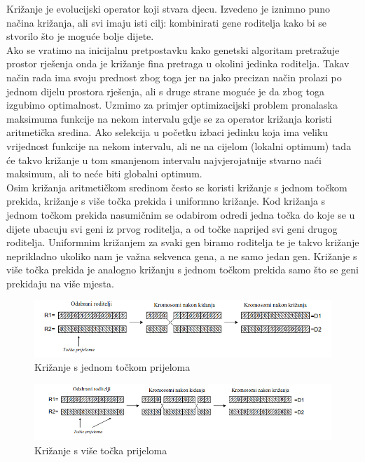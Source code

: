 \documentclass[times, utf8, zavrsni]{fer}
\begin{document}
	Križanje je evolucijski operator koji stvara djecu. Izvedeno je iznimno puno načina križanja, ali svi imaju isti cilj: kombinirati gene roditelja kako bi se stvorilo što je moguće bolje dijete. \\Ako se vratimo na inicijalnu pretpostavku kako genetski algoritam pretražuje prostor rješenja onda je križanje fina pretraga u okolini jedinka roditelja. Takav način rada ima svoju prednost zbog toga jer na jako precizan način prolazi po jednom dijelu prostora rješenja, ali s druge strane moguće je da zbog toga izgubimo optimalnost. Uzmimo za primjer optimizacijski problem pronalaska maksimuma funkcije na nekom intervalu gdje se za operator križanja koristi aritmetička sredina. Ako selekcija u početku izbaci jedinku koja ima veliku vrijednost funkcije na nekom intervalu, ali ne na cijelom (lokalni optimum) tada će takvo križanje u tom smanjenom intervalu najvjerojatnije stvarno naći maksimum, ali to neće biti globalni optimum. \\Osim križanja aritmetičkom sredinom često se koristi križanje s jednom točkom prekida, križanje s više točka prekida i uniformno križanje. Kod križanja s jednom točkom prekida nasumičnim se odabirom odredi jedna točka do koje se u dijete ubacuju svi geni iz prvog roditelja, a od točke naprijed svi geni drugog roditelja. Uniformnim križanjem za svaki gen biramo roditelja te je takvo križanje neprikladno ukoliko nam je važna sekvenca gena, a ne samo jedan gen. Križanje s više točka prekida je analogno križanju s jednom točkom prekida samo što se geni prekidaju na više mjesta.
	
	\begin{figure}[H]
		\centering
		\includegraphics[width=12cm]{slike/crossOnePoint.png}
		\caption{Križanje s jednom točkom prijeloma}
		\label{fig:one-cross}
	\end{figure}
	
	\begin{figure}[H]
		\centering
		\includegraphics[width=12cm]{slike/crossTPoint.png}
		\caption{Križanje s više točka prijeloma}
		\label{fig:t-crosses}
	\end{figure}
	
\end{document}
